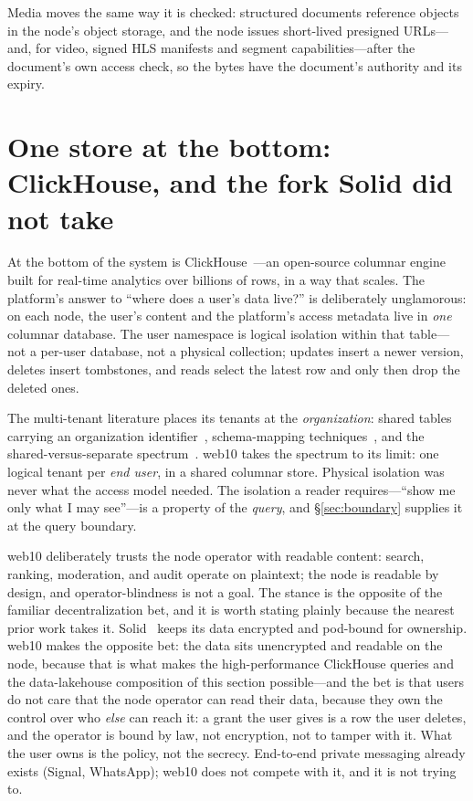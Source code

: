 \documentclass[sigconf, nonacm]{acmart}
\begin{document}
Media moves the same way it is checked: structured documents reference
objects in the node's object storage, and the node issues short-lived
presigned URLs---and, for video, signed HLS manifests and segment
capabilities---after the document's own access check, so the bytes have
the document's authority and its expiry.

\section{One store at the bottom: ClickHouse, and the fork Solid did not
take}
\label{sec:store}

At the bottom of the system is ClickHouse~\cite{clickhouse2024}---an
open-source columnar engine built for real-time analytics over
billions of rows, in a way that scales. The platform's answer to
``where does a user's data live?'' is deliberately unglamorous: on each
node, the user's content and the platform's access metadata live in
\emph{one} columnar database. The user namespace is logical isolation
within that table---not a per-user database, not a physical
collection; updates insert a newer version, deletes insert tombstones,
and reads select the latest row and only then drop the deleted ones.

The multi-tenant literature places its tenants at the
\emph{organization}: shared tables carrying an organization
identifier~\cite{force2009}, schema-mapping
techniques~\cite{aulbach2008}, and the shared-versus-separate
spectrum~\cite{jacobs2007}. web10 takes the
spectrum to its limit: one logical tenant per \emph{end user}, in a
shared columnar store. Physical isolation was never what the access
model needed. The isolation a reader requires---``show me only what I
may see''---is a property of the \emph{query}, and
\S\ref{sec:boundary} supplies it at the query boundary.

web10 deliberately trusts the node operator with readable content:
search, ranking, moderation, and audit operate on plaintext; the node
is readable by design, and operator-blindness is not a goal. The stance
is the opposite of the familiar decentralization bet, and it is worth
stating plainly because the nearest prior work takes it.
Solid~\cite{solid2016} keeps its data encrypted and pod-bound for
ownership. web10 makes the opposite bet: the data sits unencrypted and
readable on the node, because that is what makes the high-performance
ClickHouse queries and the data-lakehouse composition of this section
possible---and the bet is that users do not care that the node operator
can read their data, because they own the control over who \emph{else}
can reach it: a grant the user gives is a row the user deletes, and the
operator is bound by law, not encryption, not to tamper with it. What
the user owns is the policy, not the secrecy. End-to-end private
messaging already exists (Signal, WhatsApp); web10 does not compete
with it, and it is not trying to.
\end{document}

